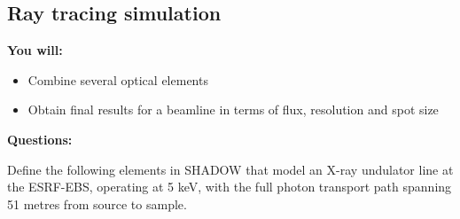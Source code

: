 
\subsection{Ray tracing simulation}
\textbf{You will:}

\begin{itemize}
    \item Combine several optical elements
    \item Obtain final results for a beamline in terms of flux, resolution and spot size
\end{itemize}

\textbf{Questions:}

Define the following elements in SHADOW that model an X-ray undulator line at the ESRF-EBS, operating at 5 keV, with the full photon transport path spanning 51 metres from source to sample.


